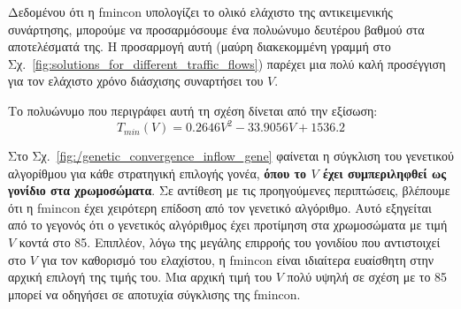 \documentclass[a4paper,12pt]{article}
\begin{document}
Δεδομένου ότι η fmincon υπολογίζει το ολικό ελάχιστο της 
αντικειμενικής συνάρτησης, μπορούμε να προσαρμόσουμε ένα πολυώνυμο δευτέρου βαθμού στα αποτελέσματά της.  
Η προσαρμογή αυτή (μαύρη διακεκομμένη γραμμή στο Σχ.~\ref{fig:solutions_for_different_traffic_flows})  
παρέχει μια πολύ καλή προσέγγιση για τον ελάχιστο χρόνο διάσχισης συναρτήσει του \(V\).

Το πολυώνυμο που περιγράφει αυτή τη σχέση δίνεται από την εξίσωση:
\begin{equation}
    T_{min}(V) = 0.2646V^2 - 33.9056V + 1536.2
    \label{eq:polynomial}
\end{equation}

Στο Σχ.~\ref{fig:/genetic_convergence_inflow_gene} φαίνεται η σύγκλιση του γενετικού αλγορίθμου για κάθε
στρατηγική επιλογής γονέα, \textbf{όπου το $V$ έχει συμπεριληφθεί ως γονίδιο στα χρωμοσώματα}. Σε αντίθεση με τις
προηγούμενες περιπτώσεις, βλέπουμε ότι η fmincon έχει χειρότερη
επίδοση από τον γενετικό αλγόριθμο. Αυτό εξηγείται από το γεγονός ότι ο γενετικός αλγόριθμος έχει προτίμηση
στα χρωμοσώματα με τιμή $V$ κοντά στο 85.
Επιπλέον, λόγω της μεγάλης επιρροής του γονιδίου που αντιστοιχεί στο $V$ για τον καθορισμό του ελαχίστου, η  
fmincon είναι ιδιαίτερα ευαίσθητη στην αρχική επιλογή της τιμής του.
Μια αρχική τιμή του $V$ πολύ υψηλή σε σχέση με το 85 μπορεί να οδηγήσει σε αποτυχία σύγκλισης της 
fmincon.
\end{document}
